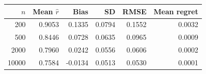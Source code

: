 \begin{tabular}{rrrrrr}
\toprule
$n$ & Mean $\widehat r$ & Bias & SD & RMSE & Mean regret \\
\midrule
200 & 0.9053 & 0.1335 & 0.0794 & 0.1552 & 0.0032 \\
500 & 0.8446 & 0.0728 & 0.0635 & 0.0965 & 0.0009 \\
2000 & 0.7960 & 0.0242 & 0.0556 & 0.0606 & 0.0002 \\
10000 & 0.7584 & -0.0134 & 0.0513 & 0.0530 & 0.0001 \\
\bottomrule
\end{tabular}
